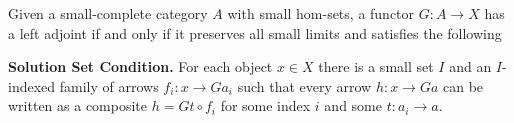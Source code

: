 Given a small-complete category $A$ with small hom-sets, a functor $G : A \rightarrow X$ has a left adjoint if and only if it preserves all small limits and satisfies the following

\textbf{Solution Set Condition.} For each object $x \in X$ there is a small set $I$ and an $I$-indexed family of arrows $f_i : x \rightarrow Ga_i$ such that every arrow $h : x \rightarrow Ga$ can be written as a composite $h = Gt \circ f_i$ for some index $i$ and some $t : a_i \rightarrow a$.
